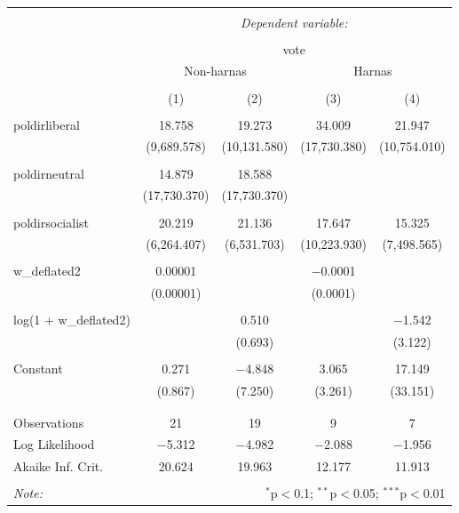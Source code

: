 
\begin{table}[!htbp] \centering 
  \caption{} 
  \label{} 
\begin{tabular}{@{\extracolsep{5pt}}lcccc} 
\\[-1.8ex]\hline 
\hline \\[-1.8ex] 
 & \multicolumn{4}{c}{\textit{Dependent variable:}} \\ 
\cline{2-5} 
\\[-1.8ex] & \multicolumn{4}{c}{vote} \\ 
 & \multicolumn{2}{c}{Non-harnas} & \multicolumn{2}{c}{Harnas} \\ 
\\[-1.8ex] & (1) & (2) & (3) & (4)\\ 
\hline \\[-1.8ex] 
 poldirliberal & 18.758 & 19.273 & 34.009 & 21.947 \\ 
  & (9,689.578) & (10,131.580) & (17,730.380) & (10,754.010) \\ 
  & & & & \\ 
 poldirneutral & 14.879 & 18.588 &  &  \\ 
  & (17,730.370) & (17,730.370) &  &  \\ 
  & & & & \\ 
 poldirsocialist & 20.219 & 21.136 & 17.647 & 15.325 \\ 
  & (6,264.407) & (6,531.703) & (10,223.930) & (7,498.565) \\ 
  & & & & \\ 
 w\_deflated2 & 0.00001 &  & $-$0.0001 &  \\ 
  & (0.00001) &  & (0.0001) &  \\ 
  & & & & \\ 
 log(1 + w\_deflated2) &  & 0.510 &  & $-$1.542 \\ 
  &  & (0.693) &  & (3.122) \\ 
  & & & & \\ 
 Constant & 0.271 & $-$4.848 & 3.065 & 17.149 \\ 
  & (0.867) & (7.250) & (3.261) & (33.151) \\ 
  & & & & \\ 
\hline \\[-1.8ex] 
Observations & 21 & 19 & 9 & 7 \\ 
Log Likelihood & $-$5.312 & $-$4.982 & $-$2.088 & $-$1.956 \\ 
Akaike Inf. Crit. & 20.624 & 19.963 & 12.177 & 11.913 \\ 
\hline 
\hline \\[-1.8ex] 
\textit{Note:}  & \multicolumn{4}{r}{$^{*}$p$<$0.1; $^{**}$p$<$0.05; $^{***}$p$<$0.01} \\ 
\end{tabular} 
\end{table} 
